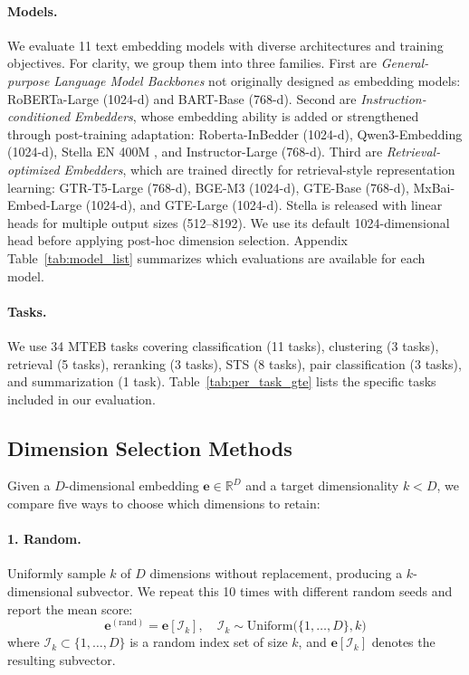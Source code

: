 \documentclass[11pt,a4paper]{article}
\begin{document}
\paragraph{Models.}
We evaluate 11 text embedding models with diverse architectures and training objectives. For clarity, we group them into three families. First are \emph{General-purpose Language Model Backbones} not originally designed as embedding models: RoBERTa-Large \citep{roberta} (1024-d) and BART-Base \citep{bart} (768-d). Second are \emph{Instruction-conditioned Embedders}, whose embedding ability is added or strengthened through post-training adaptation: Roberta-InBedder \citep{inbedder} (1024-d), Qwen3-Embedding \citep{qwen3-embedding} (1024-d), Stella EN 400M \citep{stella}, and Instructor-Large \citep{instructor} (768-d). Third are \emph{Retrieval-optimized Embedders}, which are trained directly for retrieval-style representation learning: GTR-T5-Large (768-d), BGE-M3 \citep{bge} (1024-d), GTE-Base (768-d), MxBai-Embed-Large (1024-d), and GTE-Large \citep{gte} (1024-d).
Stella is released with linear heads for multiple output sizes (512--8192). We use its default 1024-dimensional head before applying post-hoc dimension selection. Appendix Table~\ref{tab:model_list} summarizes which evaluations are available for each model.

\paragraph{Tasks.}
We use 34 MTEB tasks \citep{mteb} covering classification (11 tasks), clustering (3 tasks), retrieval (5 tasks), reranking (3 tasks), STS (8 tasks), pair classification (3 tasks), and summarization (1 task). Table~\ref{tab:per_task_gte} lists the specific tasks included in our evaluation.

\subsection{Dimension Selection Methods}

Given a $D$-dimensional embedding $\mathbf{e} \in \mathbb{R}^D$ and a target dimensionality $k < D$, we compare five ways to choose which dimensions to retain:

\paragraph{1. Random.}
Uniformly sample $k$ of $D$ dimensions without replacement, producing a $k$-dimensional subvector. We repeat this 10 times with different random seeds and report the mean score:
\begin{equation}
\mathbf{e}^{(\text{rand})} = \mathbf{e}[\mathcal{I}_k], \quad \mathcal{I}_k \sim \mathrm{Uniform}\big(\{1,\ldots,D\}, k\big)
\end{equation}
where $\mathcal{I}_k \subset \{1, \ldots, D\}$ is a random index set of size $k$, and $\mathbf{e}[\mathcal{I}_k]$ denotes the resulting subvector.
\end{document}
